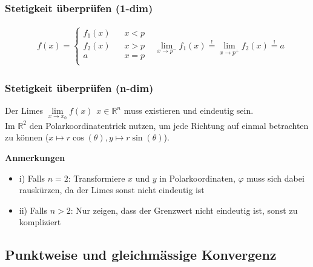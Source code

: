 \documentclass[8pt, a4paper, landscape, fleqn]{scrartcl}
\newenvironment {annotation}[1]
				{\begin{itshape} \begin{small} \textbf{#1} \begin{itemize}}
				{\end{itemize} \end{small} \end{itshape}}
\def\R{\mathbb{R}}
\begin{document}
\begin{multicols*}{3}
				\subsubsection{Stetigkeit überprüfen (1-dim)}
					\begin{align*}
						&f(x)=
						\begin{cases}
							f_1(x) \hspace{10pt} &x<p\\
							f_2(x) & x>p\\
							a &x=p\\							
						\end{cases}
						&\lim_{x \rightarrow p^-} f_1(x) \overset{!}{=} \lim_{x \rightarrow p^+} f_2(x) \overset{!}{=} a
					\end{align*}
				\subsubsection{Stetigkeit überprüfen (n-dim)}
					Der Limes $\lim\limits_{x \rightarrow x_0} f(x) \hspace{5pt} x \in \mathbb{R}^n$ muss existieren und eindeutig sein.\\ Im $\R^2$ den Polarkoordinatentrick nutzen, um jede Richtung auf einmal betrachten zu können ($x \mapsto r\cos(\theta), y \mapsto r\sin(\theta)$). \\
					\begin{annotation}{Anmerkungen}
						\item [i)] Falls $n=2$: Transformiere $x$ und $y$ in Polarkoordinaten, $\varphi$ muss sich dabei rauskürzen, da der Limes sonst nicht eindeutig ist
						\item [ii)] Falls $n>2$: Nur zeigen, dass der Grenzwert nicht eindeutig ist, sonst zu kompliziert
					\end{annotation}
			\subsection{Punktweise und gleichmässige Konvergenz}

\end{multicols*}
\end{document}
